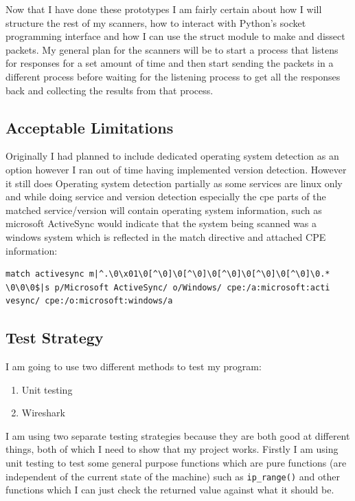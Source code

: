 \documentclass[titlepage]{article}
\let\Oldsubsection\subsection{}
\renewcommand{\subsection}{\FloatBarrier\Oldsubsection}
\begin{document}
Now that I have done these prototypes I am fairly certain about how I will structure the rest of
my scanners, how to interact with Python's socket programming interface and how I can use the
struct module to make and dissect packets. My general plan for the scanners will be to start
a process that listens for responses for a set amount of time and then start sending the packets
in a different process before waiting for the listening process to get all the responses back and
collecting the results from that process.

\subsection{Acceptable Limitations}

Originally I had planned to include dedicated operating system detection as an option
however I ran out of time having implemented version detection. However it still does
Operating system detection partially as some \glspl{service} are linux only and while doing
\gls{service} and version detection especially the \gls{cpe} parts
of the matched \gls{service}/version will contain operating system information, such as
microsoft ActiveSync would indicate that the system being scanned was a windows system
which is reflected in the match directive and attached CPE information:
\begin{verbatim}
match activesync m|^.\0\x01\0[^\0]\0[^\0]\0[^\0]\0[^\0]\0[^\0]\0.*
\0\0\0$|s p/Microsoft ActiveSync/ o/Windows/ cpe:/a:microsoft:acti
vesync/ cpe:/o:microsoft:windows/a
\end{verbatim}

\subsection{Test Strategy}

I am going to use two different methods to test my program:
\begin{enumerate}
\item{Unit testing}
\item{Wireshark}
\end{enumerate}
I am using two separate testing strategies because they are both good at different things,
both of which I need to show that my project works. Firstly I am using unit testing to test
some general purpose functions which are pure functions (are independent of the current state
of the machine) such as \verb|ip_range()| and other functions which I can just check the returned
value against what it should be.
\end{document}
